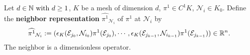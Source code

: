 \begin{definition}
  Let
    $d \in \mathbb{N}\ \text{with}\ d \geq 1$,
    $K$ be a mesh of dimension $d$,
    $\pi^1 \in C^1 K$,
    $\mathcal{N}_i \in K_0$.
  Define the \textbf{neighbor representation} $\widehat{\pi^1}_{\mathcal{N}_i}$
  of $\pi^1$ at $\mathcal{N}_i$ by
  \begin{equation}
    \widehat{\pi^1}_{\mathcal{N}_i} :=
    ( \epsilon_K(\mathcal{E}_{j_0}, \mathcal{N}_{i_0}) \pi^1(\mathcal{E}_{j_0}),
      \cdots,
        \epsilon_K(\mathcal{E}_{j_{k - 1}}, \mathcal{N}_{i_{k - 1}})
        \pi^1(\mathcal{E}_{j_{k - 1}})
    ) \in \mathbb{R}^n.
  \end{equation}
  The neighbor is a dimensionless operator.
\end{definition}
